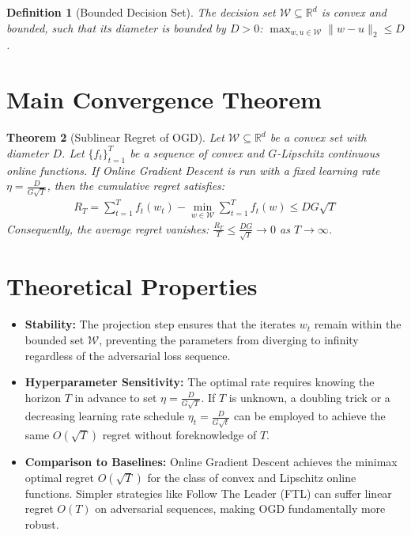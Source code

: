\documentclass{article}
\newtheorem{theorem}{Theorem}
\newtheorem{definition}[theorem]{Definition}
\begin{document}
\begin{definition}[Bounded Decision Set]
The decision set $\mathcal{W} \subseteq \mathbb{R}^d$ is convex and bounded, such that its diameter is bounded by $D > 0$:
$\max_{w, u \in \mathcal{W}} \|w - u\|_2 \leq D$.
\end{definition}

\section*{Main Convergence Theorem}
\begin{theorem}[Sublinear Regret of OGD]
Let $\mathcal{W} \subseteq \mathbb{R}^d$ be a convex set with diameter $D$. Let $\{f_t\}_{t=1}^T$ be a sequence of convex and $G$-Lipschitz continuous online functions. If Online Gradient Descent is run with a fixed learning rate $\eta = \frac{D}{G\sqrt{T}}$, then the cumulative regret satisfies:
\begin{align*}
R_T = \sum_{t=1}^T f_t(w_t) - \min_{w \in \mathcal{W}} \sum_{t=1}^T f_t(w) \leq D G \sqrt{T}
\end{align*}
Consequently, the average regret vanishes: $\frac{R_T}{T} \leq \frac{DG}{\sqrt{T}} \to 0$ as $T \to \infty$.
\end{theorem}

\section*{Theoretical Properties}
\begin{itemize}
\item \textbf{Stability:} The projection step ensures that the iterates $w_t$ remain within the bounded set $\mathcal{W}$, preventing the parameters from diverging to infinity regardless of the adversarial loss sequence.
\item \textbf{Hyperparameter Sensitivity:} The optimal rate requires knowing the horizon $T$ in advance to set $\eta = \frac{D}{G\sqrt{T}}$. If $T$ is unknown, a doubling trick or a decreasing learning rate schedule $\eta_t = \frac{D}{G\sqrt{t}}$ can be employed to achieve the same $O(\sqrt{T})$ regret without foreknowledge of $T$.
\item \textbf{Comparison to Baselines:} Online Gradient Descent achieves the minimax optimal regret $O(\sqrt{T})$ for the class of convex and Lipschitz online functions. Simpler strategies like Follow The Leader (FTL) can suffer linear regret $O(T)$ on adversarial sequences, making OGD fundamentally more robust.
\end{itemize}
\end{document}
